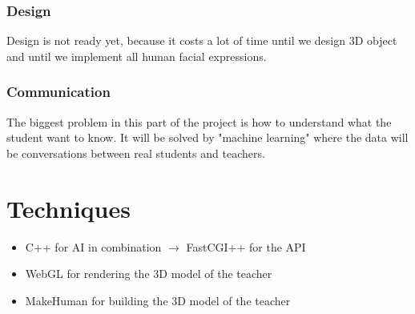 \documentclass[a4paper, 12pt]{article}
\begin{document}
			\subsubsection{Design}
				Design is not ready yet, because it costs a lot of time until we design 3D object and until we implement all human facial expressions. 
			\subsubsection{Communication}
				The biggest problem in this part of the project is how to understand what the student want to know. It will be solved by "machine learning" where the data will be conversations between real students and teachers.
	\section{Techniques}
	\begin{itemize}
		\item C++ for AI in combination $\rightarrow$ FastCGI++ for the API
		\item WebGL for rendering the 3D model of the teacher
		\item MakeHuman for building the 3D model of the teacher
	\end{itemize}
	\newpage
\end{document}
